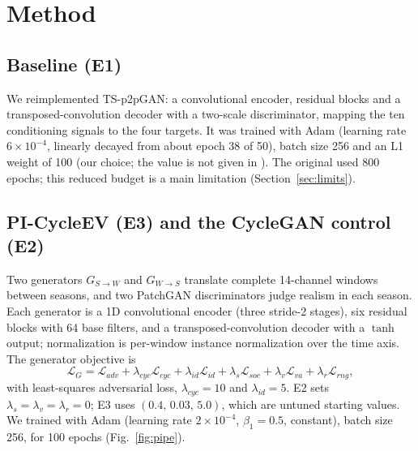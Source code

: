 \documentclass[conference]{IEEEtran}
\begin{document}
\section{Method}
\subsection{Baseline (E1)}
We reimplemented TS-p2pGAN: a convolutional encoder, residual blocks and a transposed-convolution decoder with a two-scale discriminator, mapping the ten conditioning signals to the four targets. It was trained with Adam (learning rate $6\times10^{-4}$, linearly decayed from about epoch 38 of 50), batch size 256 and an L1 weight of 100 (our choice; the value is not given in \cite{jeng2025}). The original used 800 epochs; this reduced budget is a main limitation (Section~\ref{sec:limits}).

\subsection{PI-CycleEV (E3) and the CycleGAN control (E2)}
Two generators $G_{S\rightarrow W}$ and $G_{W\rightarrow S}$ translate complete 14-channel windows between seasons, and two PatchGAN discriminators judge realism in each season. Each generator is a 1D convolutional encoder (three stride-2 stages), six residual blocks with 64 base filters, and a transposed-convolution decoder with a $\tanh$ output; normalization is per-window instance normalization over the time axis. The generator objective is
\begin{equation}
\mathcal{L}_G=\mathcal{L}_{adv}+\lambda_{cyc}\mathcal{L}_{cyc}+\lambda_{id}\mathcal{L}_{id}+\lambda_{s}\mathcal{L}_{soc}+\lambda_{v}\mathcal{L}_{va}+\lambda_{r}\mathcal{L}_{rng},
\end{equation}
with least-squares adversarial loss, $\lambda_{cyc}=10$ and $\lambda_{id}=5$. E2 sets $\lambda_s=\lambda_v=\lambda_r=0$; E3 uses $(0.4,\,0.03,\,5.0)$, which are untuned starting values. We trained with Adam (learning rate $2\times10^{-4}$, $\beta_1=0.5$, constant), batch size 256, for 100 epochs (Fig.~\ref{fig:pipe}).
\end{document}
